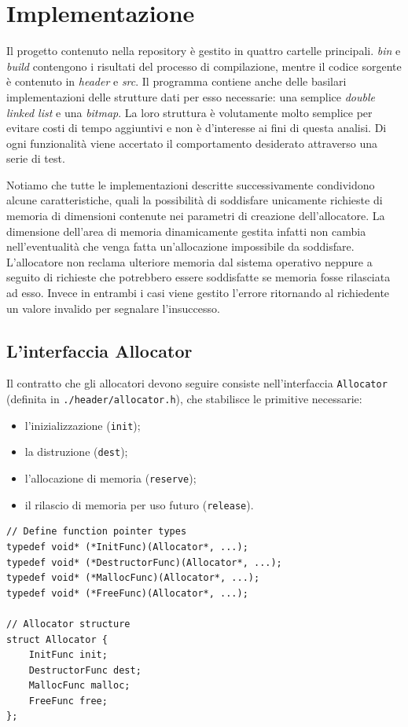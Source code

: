 \chapter{Implementazione}
Il progetto contenuto nella repository è gestito in quattro cartelle principali. \textit{bin} e \textit{build} contengono i risultati del processo di compilazione, mentre il codice sorgente è contenuto in \textit{header} e \textit{src}. Il programma contiene anche delle basilari implementazioni delle strutture dati per esso necessarie: una semplice \textit{double linked list} e una \textit{bitmap}. La loro struttura è volutamente molto semplice per evitare costi di tempo aggiuntivi e non è d’interesse ai fini di questa analisi. Di ogni funzionalità viene accertato il comportamento desiderato attraverso una serie di test.

Notiamo che tutte le implementazioni descritte successivamente condividono alcune caratteristiche, quali la possibilità di soddisfare unicamente richieste di memoria di dimensioni contenute nei parametri di creazione dell'allocatore. La dimensione dell’area di memoria dinamicamente gestita infatti non cambia nell’eventualità che venga fatta un’allocazione impossibile da soddisfare. L’allocatore non reclama ulteriore memoria dal sistema operativo neppure a seguito di richieste che potrebbero essere soddisfatte se memoria fosse rilasciata ad esso. Invece in entrambi i casi viene gestito l’errore ritornando al richiedente un valore invalido per segnalare l’insuccesso.

\section{L’interfaccia Allocator}
Il contratto che gli allocatori devono seguire consiste nell’interfaccia \texttt{Allocator} (definita in \texttt{./header/allocator.h}), che stabilisce le primitive necessarie:
\begin{itemize}
    \item l’inizializzazione (\texttt{init});
    \item la distruzione (\texttt{dest});
    \item l’allocazione di memoria (\texttt{reserve});
    \item il rilascio di memoria per uso futuro (\texttt{release}).
\end{itemize}

\begin{lstlisting}
// Define function pointer types
typedef void* (*InitFunc)(Allocator*, ...);
typedef void* (*DestructorFunc)(Allocator*, ...);
typedef void* (*MallocFunc)(Allocator*, ...);  
typedef void* (*FreeFunc)(Allocator*, ...); 

// Allocator structure
struct Allocator {
    InitFunc init; 
    DestructorFunc dest;
    MallocFunc malloc;
    FreeFunc free; 
};
\end{lstlisting}

